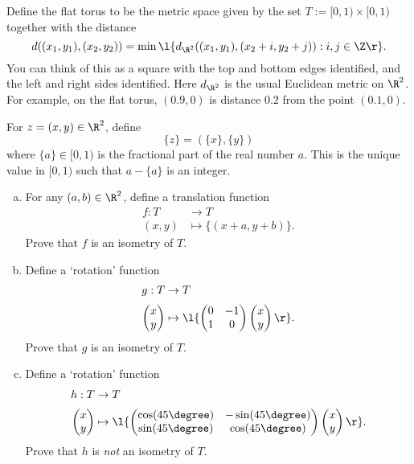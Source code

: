 \documentclass[a4paper]{article}
\begin{document}
\begin{questionbody}
Define the flat torus to be the metric space given by the set $T := [0, 1) \times [0, 1)$ together with the distance \[ %
d((x_1, y_1), (x_2, y_2)) = \min\l\{ d_{\R^2}((x_1, y_1), (x_2 + i, y_2 + j)) : i, j \in \Z \r\}.
\] You can think of this as a square with the top and bottom edges identified, and the left and right sides identified. Here $d_{\R^2}$ is the usual Euclidean metric on $\R^2$. For example, on the flat torus, $(0.9, 0)$ is distance $0.2$ from the point $(0.1, 0)$.

For $z = (x, y) \in \R^2$, define \[ \{z\} = (\{x\}, \{y\}) \] where $\{a\} \in [0, 1)$ is the fractional part of the real number $a$. This is the unique value in $[0, 1)$ such that $a - \{a\}$ is an integer. %

\begin{enumerate}[(a)]
\item For any $(a, b) \in \R^2$, define a translation function \begin{align*}
    f : T &\to T \\[0.5ex]
    (x, y) &\mapsto \{(x + a, y + b)\}.
\end{align*} Prove that $f$ is an isometry of $T$.
%
\item Define a \enquote*{rotation} function \begin{align*}
    g : T &\to T \\[0.5ex]
    \begin{pmatrix} x \\ y \end{pmatrix} &\mapsto \l\{ \begin{pmatrix} 0 & -1 \\ 1 & 0 \end{pmatrix} \begin{pmatrix} x \\ y \end{pmatrix} \r\}.
\end{align*} Prove that $g$ is an isometry of $T$.
%
\item Define a \enquote*{rotation} function \begin{align*}
    h : T &\to T \\[0.5ex]
    \begin{pmatrix} x \\ y \end{pmatrix} &\mapsto \l\{ \begin{pmatrix} \cos(45\degree) & -\sin(45\degree) \\ \sin(45\degree) & \cos(45\degree) \end{pmatrix} \begin{pmatrix} x \\ y \end{pmatrix} \r\}.
\end{align*} Prove that $h$ is \textit{not} an isometry of $T$.
\end{enumerate}
\end{questionbody}
\end{document}
